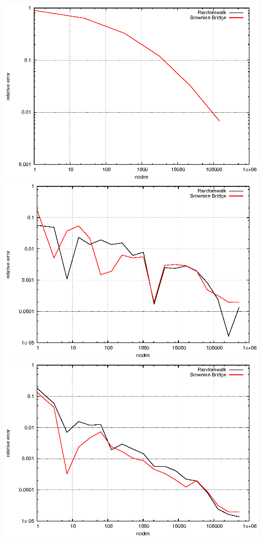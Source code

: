 \documentclass[]{article}
\begin{document}
\includegraphics{task16_trapsparse}\\
\includegraphics{task16_mc}\\
\includegraphics{task16_qmc}\\
\end{document}
